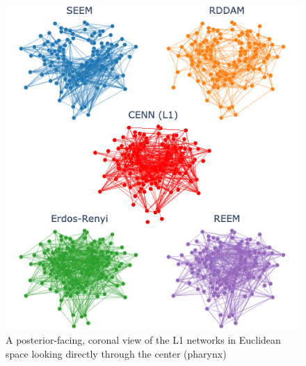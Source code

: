 \begin{figure}[ht]
  \centering
  \includegraphics[width=\linewidth]{../data/images/3D/all1_middle.png}
  \caption{A posterior-facing, coronal view of the L1 networks in Euclidean space looking directly through the center (pharynx) }
\end{figure}